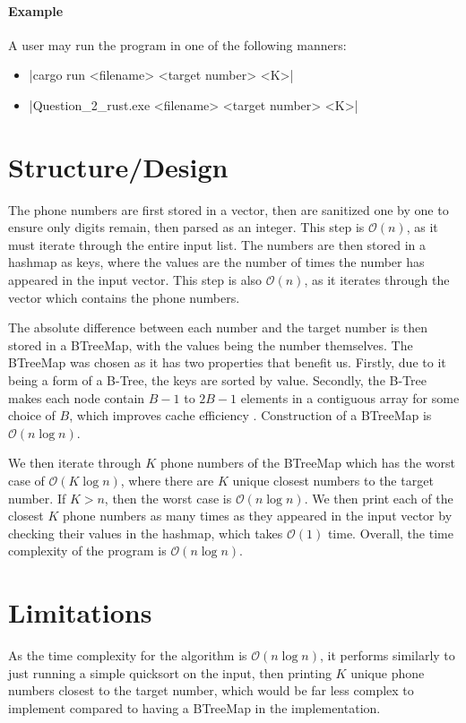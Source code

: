 \documentclass{report}
\begin{document}
\paragraph{Example}
A user may run the program in one of the following manners:
\begin{itemize}
	\item |cargo run <filename> <target number> <K>|
	\item |Question_2_rust.exe <filename> <target number> <K>|
\end{itemize}

\section{Structure/Design}
The phone numbers are first stored in a vector, then are sanitized one by one to ensure only digits remain, then parsed as an integer. This step is \(\mathcal{O}(n)\), as it must iterate through the entire input list. The numbers are then stored in a hashmap as keys, where the values are the number of times the number has appeared in the input vector. This step is also \(\mathcal{O}(n)\), as it iterates through the vector which contains the phone numbers.

The absolute difference between each number and the target number is then stored in a BTreeMap, with the values being the number themselves. The BTreeMap was chosen as it has two properties that benefit us. Firstly, due to it being a form of a B-Tree, the keys are sorted by value. Secondly, the B-Tree makes each node contain \(B-1\) to \(2B-1\) elements in a contiguous array for some choice of \(B\), which improves cache efficiency \autocite{rustlang_btreemap_2015}. Construction of a BTreeMap is \(\mathcal{O}(n \log n)\).

We then iterate through \(K\) phone numbers of the BTreeMap which has the worst case of \(\mathcal{O}(K \log n)\), where there are \(K\) unique closest numbers to the target number. If \(K > n\), then the worst case is \(\mathcal{O}(n \log n)\). We then print each of the closest \(K\) phone numbers as many times as they appeared in the input vector by checking their values in the hashmap, which takes \(\mathcal{O}(1)\) time. Overall, the time complexity of the program is \(\mathcal{O}(n \log n)\).

\section{Limitations}
As the time complexity for the algorithm is \(\mathcal{O}(n \log n)\), it performs similarly to just running a simple quicksort on the input, then printing \(K\) unique phone numbers closest to the target number, which would be far less complex to implement compared to having a BTreeMap in the implementation.
\end{document}
